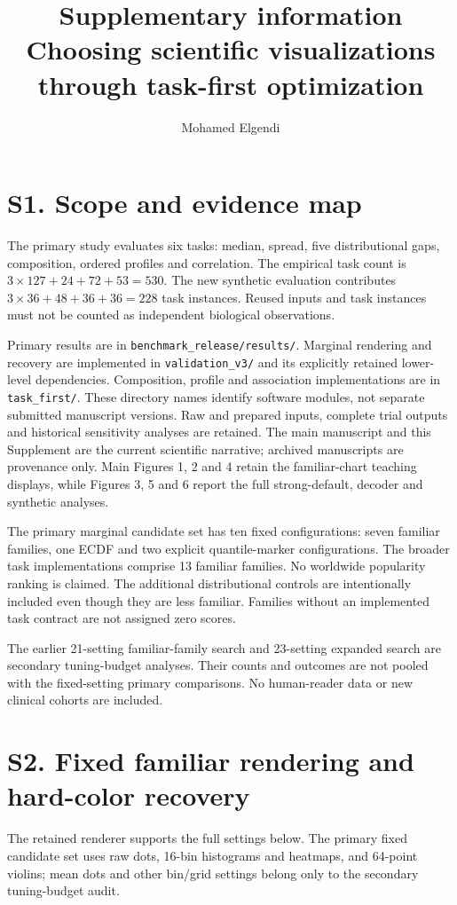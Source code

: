 \documentclass[10pt]{article}
\title{Supplementary information\\Choosing scientific visualizations through task-first optimization}
\author{Mohamed Elgendi}\date{}
\begin{document}
\maketitle
\section*{S1. Scope and evidence map}
The primary study evaluates six tasks: median, spread, five distributional gaps, composition, ordered profiles and correlation. The empirical task count is $3\times127+24+72+53=530$. The new synthetic evaluation contributes $3\times36+48+36+36=228$ task instances. Reused inputs and task instances must not be counted as independent biological observations.

Primary results are in \texttt{benchmark\_release/results/}. Marginal rendering and recovery are implemented in \texttt{validation\_v3/} and its explicitly retained lower-level dependencies. Composition, profile and association implementations are in \texttt{task\_first/}. These directory names identify software modules, not separate submitted manuscript versions. Raw and prepared inputs, complete trial outputs and historical sensitivity analyses are retained. The main manuscript and this Supplement are the current scientific narrative; archived manuscripts are provenance only. Main Figures 1, 2 and 4 retain the familiar-chart teaching displays, while Figures 3, 5 and 6 report the full strong-default, decoder and synthetic analyses.

The primary marginal candidate set has ten fixed configurations: seven familiar families, one ECDF and two explicit quantile-marker configurations. The broader task implementations comprise 13 familiar families. No worldwide popularity ranking is claimed. The additional distributional controls are intentionally included even though they are less familiar. Families without an implemented task contract are not assigned zero scores.

The earlier 21-setting familiar-family search and 23-setting expanded search are secondary tuning-budget analyses. Their counts and outcomes are not pooled with the fixed-setting primary comparisons. No human-reader data or new clinical cohorts are included.

\section*{S2. Fixed familiar rendering and hard-color recovery}
The retained renderer supports the full settings below. The primary fixed candidate set uses raw dots, 16-bin histograms and heatmaps, and 64-point violins; mean dots and other bin/grid settings belong only to the secondary tuning-budget audit.
\end{document}
